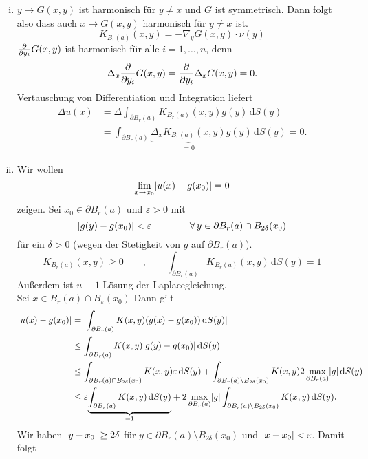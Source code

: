 	\begin{beweis}
		\begin{enumerate}[(i)]
			\item $ y \to G(x,y)$ ist harmonisch für $y \neq x$ und $G$ ist symmetrisch. Dann folgt also dass auch $x \to G(x,y)$ harmonisch für $y \neq x$ ist.
			\[
				K_{B_r(a)}(x,y) = -  \nabla_y G(x,y) \cdot \nu(y) 
			\]
			$\frac{{\partial }}{{\partial y_i}} G(x,y)$ ist harmonisch für alle $i = 1, \dots,n$, denn
			\[
				\Delta_x \frac{{\partial }}{{\partial y_i}} G(x,y) = \frac{{\partial }}{{\partial y_i}}  \Delta_x G(x,y) = 0.
			\]
			Vertauschung von Differentiation und Integration liefert
			\begin{align*}
				\Delta u (x) &= \Delta \int_{\partial B_r(a)}^{} K_{B_r(a)}(x,y)g(y) \,\mathrm{d}S(y) \\
				&= \int_{\partial B_r(a)}^{} \underset{=0}{\underbrace{ \Delta_x K_{B_r(a)}(x,y)}}g(y) \,\mathrm{d}S(y) = 0.
			\end{align*}
			\item Wir wollen 
			\[
				\lim_{x \to x_0} \lvert u(x)-g(x_0)\rvert=0
			\]
			zeigen. Sei $x_0 \in  \partial B_r(a)$ und $\varepsilon >0$ mit
			\[
				\lvert g(y)-g(x_0)\rvert < \varepsilon \qquad \qquad \forall\, y \in \partial B_r(a) \cap B_{2 \delta}(x_0)
			\]
			für ein $\delta > 0$ (wegen der Stetigkeit von $g$ auf $\partial B_r(a)$). 
			\[
				K_{B_r(a)}(x,y) \geq 0 \qquad , \qquad \int_{\partial B_r(a)}^{} K_{B_r(a)}(x,y) \,\mathrm{d}S(y) = 1
			\]
			Außerdem ist $u \equiv 1$ Lösung der Laplacegleichung. \\
			Sei $x \in B_r(a) \cap B_{\varepsilon}(x_0)$ Dann gilt
			\begin{align*}
				\lvert u(x)-g(x_0)\rvert &= \lvert\int_{\partial B_r(a)}^{} K(x,y)(g(x)-g(x_0)) \,\mathrm{d}S(y)\rvert \\
				&\leq \int_{\partial B_r(a)}^{} K(x,y)\lvert g(y)-g(x_0)\rvert \,\mathrm{d}S(y) \\
				&\leq \int_{\partial B_r(a) \cap B_{2 \delta}(x_0)}^{} K(x,y) \varepsilon \,\mathrm{d}S(y) 
				+ \int_{\partial B_r(a) \setminus B_{2 \delta}(x_0)}^{} K(x,y) 2 \max_{\partial B_r(a)} \lvert g\rvert \,\mathrm{d}S(y) \\
				&\leq  \varepsilon \underset{=1}{\underbrace{\int_{\partial B_r(a)}^{} K(x,y) \,\mathrm{d}S(y) }}
				+ 2 \max_{\partial B_r(a)}\lvert g\rvert \int_{\partial B_r(a) \setminus B_{2 \delta }(x_0)}^{} K(x,y) \,\mathrm{d}S(y) .
			\end{align*}
			Wir haben $\lvert y-x_0\rvert \geq 2 \delta $ für $y \in \partial B_r(a) \setminus B_{2 \delta }(x_0)$ und $\lvert x-x_0\rvert < \varepsilon$. Damit folgt
			\[
\]
\end{enumerate}
\end{beweis}

